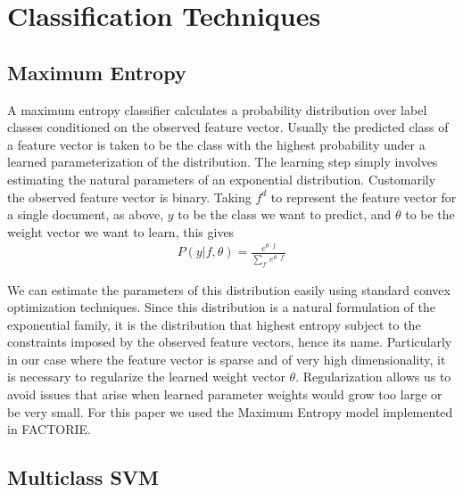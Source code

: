 \section{Classification Techniques}

\subsection{Maximum Entropy} %
\label{sub:maximum_entropy}
A maximum entropy classifier calculates a probability distribution over label classes conditioned on the observed feature vector. Usually the predicted class of a feature vector is taken to be the class with the highest probability under a learned parameterization of the distribution. The learning step simply involves estimating the natural parameters of an exponential distribution. Customarily the observed feature vector is binary. Taking $f^d$ to represent the feature vector for a single document, as above, $y$ to be the class we want to predict, and $\theta$ to be the weight vector we want to learn, this gives
\begin{align*}
	P(y|f, \theta) = \frac{e^{\theta \cdot f}}{\sum_{f'} e^{\theta \cdot f'}}
\end{align*}

We can estimate the parameters of this distribution easily using standard convex optimization techniques. Since this distribution is a natural formulation of the exponential family, it is the distribution that highest entropy subject to the constraints imposed by the observed feature vectors, hence its name. Particularly in our case where the feature vector is sparse and of very high dimensionality, it is necessary to regularize the learned weight vector $\theta$. Regularization allows us to avoid issues that arise when learned parameter weights would grow too large or be very small.
For this paper we used the Maximum Entropy model implemented in FACTORIE.


\subsection{Multiclass SVM} %
\label{sub:multiclass_svm}


